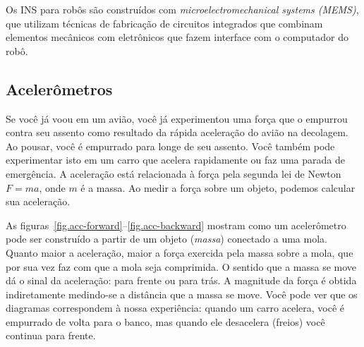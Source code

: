 Os INS para robôs são construídos com \emph{microelectromechanical systems (MEMS)}, que utilizam técnicas de fabricação de circuitos integrados que combinam elementos mecânicos com eletrônicos que fazem interface com o computador do robô.

\subsection{Acelerômetros}\label{s.accelerometer}

Se você já voou em um avião, você já experimentou uma força que o empurrou contra seu assento como resultado da rápida aceleração do avião na decolagem. Ao pousar, você é empurrado para longe de seu assento. Você também pode experimentar isto em um carro que acelera rapidamente ou faz uma parada de emergência. A aceleração está relacionada à força pela segunda lei de Newton $F=ma$, onde $m$ é a massa. Ao medir a força sobre um objeto, podemos calcular sua aceleração.

As figuras~\ref{fig.acc-forward}--\ref{fig.acc-backward} mostram como um acelerômetro pode ser construído a partir de um objeto (\emph{massa}) conectado a uma mola. Quanto maior a aceleração, maior a força exercida pela massa sobre a mola, que por sua vez faz com que a mola seja comprimida. O sentido que a massa se move dá o sinal da aceleração: para frente ou para trás. A magnitude da força é obtida indiretamente medindo-se a distância que a massa se move. Você pode ver que os diagramas correspondem à nossa experiência: quando um carro acelera, você é empurrado de volta para o banco, mas quando ele desacelera (freios) você continua para frente.

